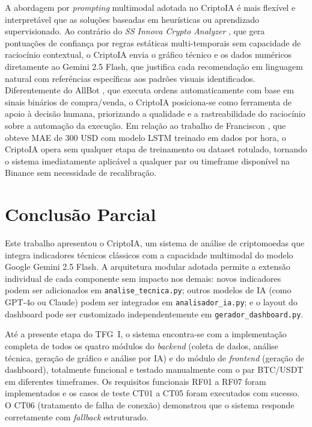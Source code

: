 \documentclass[conference]{IEEEtran}
\begin{document}
A abordagem por \textit{prompting} multimodal adotada no CriptoIA \'e mais flex\'ivel e interpret\'avel que as solu\c{c}\~oes baseadas em heur\'isticas ou aprendizado supervisionado. Ao contr\'ario do \textit{SS Innova Crypto Analyzer} \cite{monteiro2026ssinnova}, que gera pontua\c{c}\~oes de confian\c{c}a por regras est\'aticas multi-temporais sem capacidade de racioc\'inio contextual, o CriptoIA envia o gr\'afico t\'ecnico e os dados num\'ericos diretamente ao Gemini 2.5 Flash, que justifica cada recomenda\c{c}\~ao em linguagem natural com refer\'encias espec\'ificas aos padr\~oes visuais identificados. Diferentemente do AllBot \cite{silvajunior2022allbot}, que executa ordens automaticamente com base em sinais bin\'arios de compra/venda, o CriptoIA posiciona-se como ferramenta de apoio \`{a} decis\~ao humana, priorizando a qualidade e a rastreabilidade do racioc\'inio sobre a automa\c{c}\~ao da execu\c{c}\~ao. Em rela\c{c}\~ao ao trabalho de Franciscon \cite{franciscon2023lstm}, que obteve MAE de 300 USD com modelo LSTM treinado em dados por hora, o CriptoIA opera sem qualquer etapa de treinamento ou dataset rotulado, tornando o sistema imediatamente aplic\'avel a qualquer par ou timeframe dispon\'ivel na Binance sem necessidade de recalibra\c{c}\~ao.

\section{Conclusão Parcial}
\label{sec:conclusao}

Este trabalho apresentou o CriptoIA, um sistema de análise de criptomoedas que integra indicadores técnicos clássicos com a capacidade multimodal do modelo Google Gemini 2.5 Flash. A arquitetura modular adotada permite a extensão individual de cada componente sem impacto nos demais: novos indicadores podem ser adicionados em \texttt{analise\_tecnica.py}; outros modelos de IA (como GPT-4o ou Claude) podem ser integrados em \texttt{analisador\_ia.py}; e o layout do dashboard pode ser customizado independentemente em \texttt{gerador\_dashboard.py}.

Até a presente etapa do TFG~I, o sistema encontra-se com a implementação completa de todos os quatro módulos do \textit{backend} (coleta de dados, análise técnica, geração de gráfico e análise por IA) e do módulo de \textit{frontend} (geração de dashboard), totalmente funcional e testado manualmente com o par BTC/USDT em diferentes timeframes. Os requisitos funcionais RF01 a RF07 foram implementados e os casos de teste CT01 a CT05 foram executados com sucesso. O CT06 (tratamento de falha de conexão) demonstrou que o sistema responde corretamente com \textit{fallback} estruturado.
\end{document}
